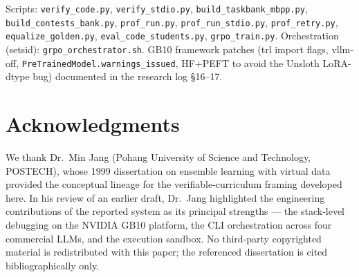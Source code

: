 \documentclass[11pt]{article}
\begin{document}
\medskip\noindent
Scripts: \texttt{verify\_code.py},
\texttt{verify\_stdio.py}, \texttt{build\_taskbank\_mbpp.py}, \texttt{build\_contests\_bank.py},
\texttt{prof\_run.py}, \texttt{prof\_run\_stdio.py}, \texttt{prof\_retry.py},
\texttt{equalize\_golden.py}, \texttt{eval\_code\_students.py}, \texttt{grpo\_train.py}.
Orchestration (setsid): \texttt{grpo\_orchestrator.sh}. GB10 framework patches (trl import
flags, vllm-off, \texttt{PreTrainedModel.warnings\_issued}, HF$+$PEFT to avoid the Unsloth
LoRA-dtype bug) documented in the research log \S16--17.

\section*{Acknowledgments}
We thank Dr.\ Min Jang (Pohang University of Science and Technology, POSTECH),
whose 1999 dissertation on ensemble learning with virtual data \citep{jang1999ola}
provided the conceptual lineage for the verifiable-curriculum framing developed here.
In his review of an earlier draft, Dr.\ Jang highlighted the engineering contributions
of the reported system as its principal strengths --- the stack-level debugging on the
NVIDIA GB10 platform, the CLI orchestration across four commercial LLMs, and the
execution sandbox. No third-party copyrighted material is redistributed with this
paper; the referenced dissertation is cited bibliographically only.



\end{document}
